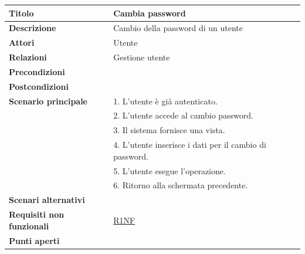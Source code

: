 \documentclass[a4paper]{article}
\begin{document}
\begin{center}
\begin{tabularx}{1\textwidth}{|l|X|}
    \hline
	\textbf{Titolo} & Cambia password \\
	\hline
	\textbf{Descrizione} & Cambio della password di un utente \\
	\hline
	\textbf{Attori} & Utente \\
	\hline
	\textbf{Relazioni} & Gestione utente \\
	\hline
	\textbf{Precondizioni} &  \\
	\hline
	\textbf{Postcondizioni} &  \\
	\hline
	\textbf{Scenario principale} & 1. L'utente è già autenticato.\\
	                             & 2. L'utente accede al cambio password. \\
								 & 3. Il sistema fornisce una vista. \\
								 & 4. L'utente inserisce i dati per il cambio di password. \\
								 & 5. L'utente esegue l'operazione.\\
								 & 6. Ritorno alla schermata precedente.\\
	\hline
	\textbf{Scenari alternativi} & \\
	\hline
	\textbf{Requisiti non funzionali} & \hyperlink{R1NF}{R1NF} \\
	\hline
	\textbf{Punti aperti} & \\
	\hline
\end{tabularx}
\end{center}

\end{document}
